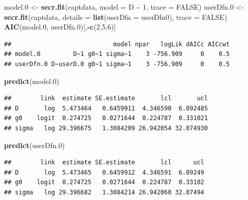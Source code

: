 \documentclass[
]{book}
\newenvironment{Shaded}{\begin{snugshade}}{\end{snugshade}}
\newcommand{\AttributeTok}[1]{\textcolor[rgb]{0.13,0.29,0.53}{#1}}
\newcommand{\ConstantTok}[1]{\textcolor[rgb]{0.56,0.35,0.01}{#1}}
\newcommand{\DecValTok}[1]{\textcolor[rgb]{0.00,0.00,0.81}{#1}}
\newcommand{\FloatTok}[1]{\textcolor[rgb]{0.00,0.00,0.81}{#1}}
\newcommand{\FunctionTok}[1]{\textcolor[rgb]{0.13,0.29,0.53}{\textbf{#1}}}
\newcommand{\NormalTok}[1]{#1}
\newcommand{\OtherTok}[1]{\textcolor[rgb]{0.56,0.35,0.01}{#1}}
\newcommand{\SpecialCharTok}[1]{\textcolor[rgb]{0.81,0.36,0.00}{\textbf{#1}}}
\begin{document}
\begin{Shaded}
\begin{Highlighting}[]
\NormalTok{model}\FloatTok{.0} \OtherTok{\textless{}{-}} \FunctionTok{secr.fit}\NormalTok{(captdata, }\AttributeTok{model =}\NormalTok{ D }\SpecialCharTok{\textasciitilde{}} \DecValTok{1}\NormalTok{, }\AttributeTok{trace =} \ConstantTok{FALSE}\NormalTok{)}
\NormalTok{userDfn}\FloatTok{.0} \OtherTok{\textless{}{-}} \FunctionTok{secr.fit}\NormalTok{(captdata, }\AttributeTok{details =} \FunctionTok{list}\NormalTok{(}\AttributeTok{userDfn =} 
\NormalTok{    userDfn0), }\AttributeTok{trace =} \ConstantTok{FALSE}\NormalTok{)}
\FunctionTok{AIC}\NormalTok{(model}\FloatTok{.0}\NormalTok{, userDfn}\FloatTok{.0}\NormalTok{)[,}\SpecialCharTok{{-}}\FunctionTok{c}\NormalTok{(}\DecValTok{2}\NormalTok{,}\DecValTok{5}\NormalTok{,}\DecValTok{6}\NormalTok{)]}
\end{Highlighting}
\end{Shaded}

\begin{verbatim}
##                            model npar   logLik dAICc AICcwt
## model.0         D~1 g0~1 sigma~1    3 -756.909     0    0.5
## userDfn.0 D~userD.0 g0~1 sigma~1    3 -756.909     0    0.5
\end{verbatim}

\begin{Shaded}
\begin{Highlighting}[]
\FunctionTok{predict}\NormalTok{(model}\FloatTok{.0}\NormalTok{)}
\end{Highlighting}
\end{Shaded}

\begin{verbatim}
##        link  estimate SE.estimate       lcl       ucl
## D       log  5.473464   0.6459911  4.346590  6.892485
## g0    logit  0.274725   0.0271644  0.224787  0.331021
## sigma   log 29.396675   1.3084209 26.942054 32.074930
\end{verbatim}

\begin{Shaded}
\begin{Highlighting}[]
\FunctionTok{predict}\NormalTok{(userDfn}\FloatTok{.0}\NormalTok{)}
\end{Highlighting}
\end{Shaded}

\begin{verbatim}
##        link  estimate SE.estimate       lcl      ucl
## D       log  5.473465   0.6459912  4.346591  6.89249
## g0    logit  0.274725   0.0271644  0.224787  0.33102
## sigma   log 29.396682   1.3084214 26.942060 32.07494
\end{verbatim}
\end{document}
